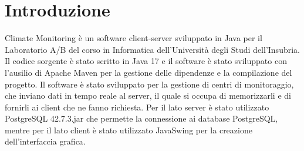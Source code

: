 \NoBgThispage
\section{Introduzione}

Climate Monitoring è un software client-server sviluppato in Java per il Laboratorio A/B del corso in Informatica dell’Università degli Studi dell’Insubria.
Il codice sorgente è stato scritto in Java 17 e il software è stato sviluppato con l’ausilio di Apache Maven per la gestione delle dipendenze e la compilazione del progetto.
Il software è stato sviluppato per la gestione di centri di monitoraggio, che inviano dati in tempo reale al server, il quale si occupa di memorizzarli e di fornirli ai client che ne fanno richiesta.
Per il lato server è stato utilizzato PostgreSQL 42.7.3.jar che permette la connessione ai database PostgreSQL, mentre per il lato client è stato utilizzato JavaSwing per la creazione dell’interfaccia grafica.